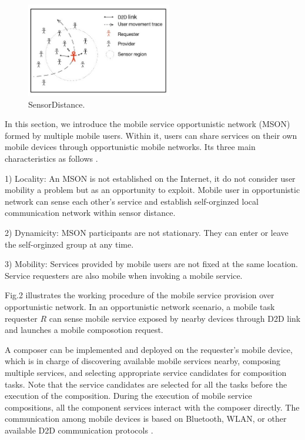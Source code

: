 \documentclass[10pt,journal,compsoc]{IEEEtran}
\begin{document}
\begin{figure}[!t]
\centering
\includegraphics[width=2.5in]{./img/fig2.jpg}
\caption{SensorDistance.}
\label{fig_sim}
\end{figure}

In this section, we introduce the mobile service opportunistic network (MSON) formed by multiple mobile users. Within it, users can share services on their own mobile devices through opportunistic mobile networks. Its three main characteristics as follows \cite{Deng2017}.

1) Locality: An MSON is not established on the Internet, it do not consider user mobility a problem but as an opportunity to exploit. Mobile user in opportunistic network can sense each other's service and establish self-orginzed local communication network within sensor distance.

2) Dynamicity: MSON participants are not stationary. They can enter or leave the self-orginzed group at any time.

3) Mobility: Services provided by mobile users are not fixed at the same location. Service requesters are also mobile when invoking a mobile service.

Fig.2 illustrates the working procedure of the mobile service provision over opportunistic network. In an opportunistic network scenario, a mobile task requester $R$ can sense mobile service exposed by nearby devices through D2D link and launches a mobile composotion request. 

A composer can be implemented and deployed on the requester’s mobile device, which is in charge of discovering available mobile services nearby, composing multiple services, and selecting appropriate service candidates for composition tasks. Note that the service candidates are selected for all the tasks before the execution of the composition. During the execution of mobile service compositions, all the component services interact with the composer directly. The communication among mobile devices is based on Bluetooth, WLAN, or other available D2D communication protocols \cite{Deng2017}.
\end{document}
